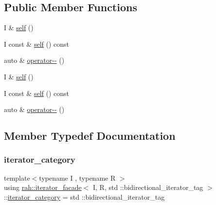 \subsection*{Public Member Functions}
\begin{DoxyCompactItemize}
\item 
I \& \mbox{\hyperlink{structrah_1_1iterator__facade_3_01_i_00_01_r_00_01std_01_1_1bidirectional__iterator__tag_01_4_a37ec81c2ce7b850cce5f99fd9341e7e4}{self}} ()
\item 
I const  \& \mbox{\hyperlink{structrah_1_1iterator__facade_3_01_i_00_01_r_00_01std_01_1_1bidirectional__iterator__tag_01_4_a5c701173657eb1c14b92a196ea74b498}{self}} () const
\item 
auto \& \mbox{\hyperlink{structrah_1_1iterator__facade_3_01_i_00_01_r_00_01std_01_1_1bidirectional__iterator__tag_01_4_a94b052cf2d8d56ffd7747f567b2ac4d2}{operator-\/-\/}} ()
\item 
I \& \mbox{\hyperlink{structrah_1_1iterator__facade_3_01_i_00_01_r_00_01std_01_1_1bidirectional__iterator__tag_01_4_a37ec81c2ce7b850cce5f99fd9341e7e4}{self}} ()
\item 
I const  \& \mbox{\hyperlink{structrah_1_1iterator__facade_3_01_i_00_01_r_00_01std_01_1_1bidirectional__iterator__tag_01_4_a5c701173657eb1c14b92a196ea74b498}{self}} () const
\item 
auto \& \mbox{\hyperlink{structrah_1_1iterator__facade_3_01_i_00_01_r_00_01std_01_1_1bidirectional__iterator__tag_01_4_a94b052cf2d8d56ffd7747f567b2ac4d2}{operator-\/-\/}} ()
\end{DoxyCompactItemize}


\subsection{Member Typedef Documentation}
\mbox{\label{structrah_1_1iterator__facade_3_01_i_00_01_r_00_01std_01_1_1bidirectional__iterator__tag_01_4_a2dbd37e6d8e7ce99205c0dc26c7a4fd2}} 
\subsubsection{\texorpdfstring{iterator\_category}{iterator\_category}\hspace{0.1cm}{\footnotesize\ttfamily [1/2]}}
{\footnotesize\ttfamily template$<$typename I , typename R $>$ \\
using \mbox{\hyperlink{structrah_1_1iterator__facade}{rah\+::iterator\+\_\+facade}}$<$ I, R, std \+::bidirectional\+\_\+iterator\+\_\+tag $>$\+::\mbox{\hyperlink{structrah_1_1iterator__facade_3_01_i_00_01_r_00_01std_01_1_1forward__iterator__tag_01_4_a3c1278be55ca5af439eb79e2ee9a3c49}{iterator\+\_\+category}} =  std \+::bidirectional\+\_\+iterator\+\_\+tag}

